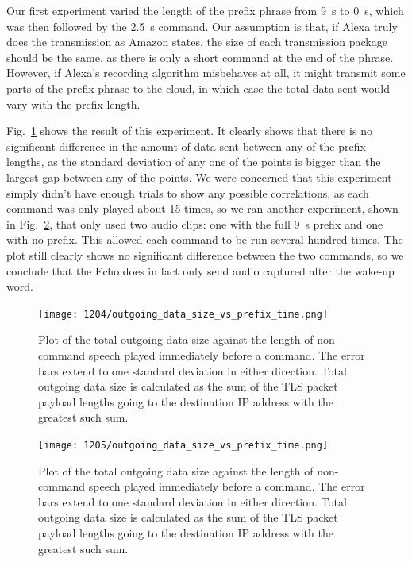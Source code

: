 Our first experiment varied the length of the prefix phrase from 9~s to 0~s, which was then followed by the 2.5~s command. Our assumption is that, if Alexa truly does the transmission as Amazon states, the size of each transmission package should be the same, as there is only a short command at the end of the phrase. However, if Alexa's recording algorithm misbehaves at all, it might transmit some parts of the prefix phrase to the cloud, in which case the total data sent would vary with the prefix length. 

Fig.~\ref{fig:prefix_many} shows the result of this experiment. It clearly shows that there is no significant difference in the amount of data sent between any of the prefix lengths, as the standard deviation of any one of the points is bigger than the largest gap between any of the points. We were concerned that this experiment simply didn't have enough trials to show any possible correlations, as each command was only played about 15 times, so we ran another experiment, shown in Fig.~\ref{fig:prefix_two}, that only used two audio clips: one with the full 9~s prefix and one with no prefix. This allowed each command to be run several hundred times. The plot still clearly shows no significant difference between the two commands, so we conclude that the Echo does in fact only send audio captured after the wake-up word.
 
\begin{figure}[!t]
    \centering
    \texttt{[image: 1204/outgoing\_data\_size\_vs\_prefix\_time.png]}
    \caption{Plot of the total outgoing data size against the length of non-command speech played immediately before a command. The error bars extend to one standard deviation in either direction. Total outgoing data size is calculated as the sum of the TLS packet payload lengths going to the destination IP address with the greatest such sum.}
    \label{fig:prefix_many}
\end{figure}

\begin{figure}[!t]
    \centering
    \texttt{[image: 1205/outgoing\_data\_size\_vs\_prefix\_time.png]}
    \caption{Plot of the total outgoing data size against the length of non-command speech played immediately before a command. The error bars extend to one standard deviation in either direction. Total outgoing data size is calculated as the sum of the TLS packet payload lengths going to the destination IP address with the greatest such sum.}
    \label{fig:prefix_two}
\end{figure}




